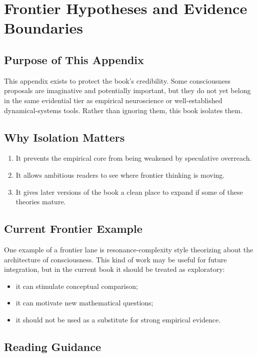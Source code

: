 \chapter{Frontier Hypotheses and Evidence Boundaries}
\label{app:frontier}

\section{Purpose of This Appendix}

This appendix exists to protect the book's credibility. Some consciousness
proposals are imaginative and potentially important, but they do not yet belong
in the same evidential tier as empirical neuroscience or well-established
dynamical-systems tools. Rather than ignoring them, this book isolates them.

\section{Why Isolation Matters}

\begin{enumerate}[nosep]
  \item It prevents the empirical core from being weakened by speculative
        overreach.
  \item It allows ambitious readers to see where frontier thinking is moving.
  \item It gives later versions of the book a clean place to expand if some of
        these theories mature.
\end{enumerate}

\section{Current Frontier Example}

One example of a frontier lane is resonance-complexity style theorizing about
the architecture of consciousness. This kind of work may be useful for future
integration, but in the current book it should be treated as exploratory:
\begin{itemize}[nosep]
  \item it can stimulate conceptual comparison;
  \item it can motivate new mathematical questions;
  \item it should not be used as a substitute for strong empirical evidence.
\end{itemize}

\section{Reading Guidance}

